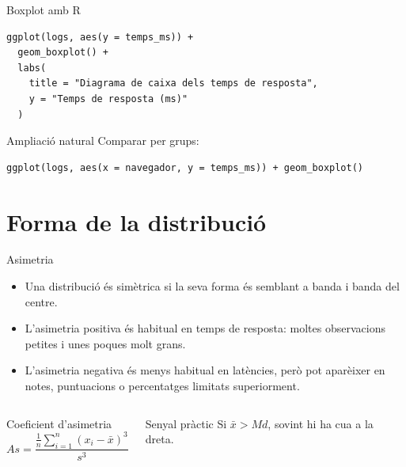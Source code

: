 \documentclass[10pt,aspectratio=169]{beamer}
\begin{document}
\begin{frame}[fragile]{Boxplot amb R}
\begin{lstlisting}
ggplot(logs, aes(y = temps_ms)) +
  geom_boxplot() +
  labs(
    title = "Diagrama de caixa dels temps de resposta",
    y = "Temps de resposta (ms)"
  )
\end{lstlisting}
\vspace{0.2cm}
\begin{block}{Ampliació natural}
Comparar per grups:
\begin{lstlisting}
ggplot(logs, aes(x = navegador, y = temps_ms)) + geom_boxplot()
\end{lstlisting}
\end{block}
\end{frame}

\section{Forma de la distribució}

\begin{frame}{Asimetria}
\begin{itemize}
  \item Una distribució és simètrica si la seva forma és semblant a banda i banda del centre.
  \item L'asimetria positiva és habitual en temps de resposta: moltes observacions petites i unes poques molt grans.
  \item L'asimetria negativa és menys habitual en latències, però pot aparèixer en notes, puntuacions o percentatges limitats superiorment.
\end{itemize}
\vspace{0.25cm}
\begin{columns}[T]
\begin{block}{Coeficient d'asimetria}
\[
As=\frac{\frac{1}{n}\sum_{i=1}^n (x_i-\bar{x})^3}{s^3}
\]
\end{block}
\begin{alertblock}{Senyal pràctic}
Si $\bar{x} > Md$, sovint hi ha cua a la dreta.
\end{alertblock}
\end{columns}
\end{frame}
\end{document}
